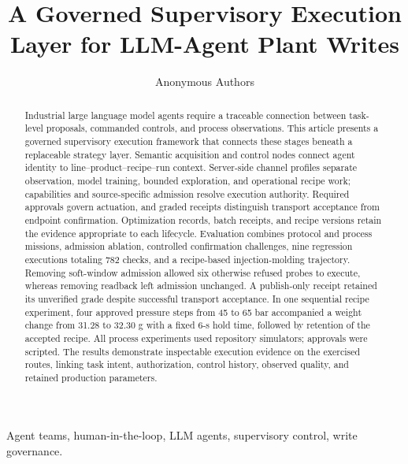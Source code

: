 \documentclass[journal]{IEEEtran}
\begin{document}

\title{A Governed Supervisory Execution Layer for LLM-Agent Plant Writes}

\author{Anonymous Authors}

\maketitle

\begin{abstract}
Industrial large language model agents require a traceable connection
between task-level proposals, commanded controls, and process observations.
This article presents a governed supervisory execution framework that
connects these stages beneath a replaceable strategy layer. Semantic
acquisition and control nodes connect agent identity to
line--product--recipe--run context. Server-side channel profiles separate
observation, model training, bounded exploration, and operational recipe
work; capabilities and source-specific admission resolve execution
authority. Required approvals govern actuation, and graded receipts
distinguish transport acceptance from endpoint confirmation. Optimization
records, batch receipts, and recipe versions retain the evidence appropriate
to each lifecycle. Evaluation combines protocol and process missions,
admission ablation, controlled confirmation challenges, nine regression
executions totaling 782 checks, and a recipe-based injection-molding
trajectory. Removing soft-window admission allowed six otherwise refused
probes to execute, whereas removing readback left admission unchanged.
A publish-only receipt retained its unverified grade despite successful
transport acceptance. In one sequential recipe experiment, four approved
pressure steps from 45 to 65 bar accompanied a weight change from
31.28 to 32.30 g with a fixed 6-s hold time, followed by retention of the
accepted recipe. All process experiments used repository simulators;
approvals were scripted. The results demonstrate inspectable execution
evidence on the exercised routes, linking task intent, authorization,
control history, observed quality, and retained production parameters.
\end{abstract}

\begin{IEEEkeywords}
Agent teams, human-in-the-loop, LLM agents, supervisory control, write
governance.
\end{IEEEkeywords}

\IEEEpeerreviewmaketitle





\FloatBarrier





\end{document}
